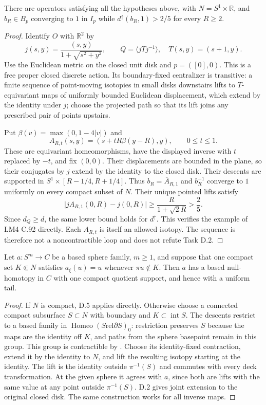 There are operators satisfying all the hypotheses above, with
$N=S^1\times\mathbb R$, and $b_R\in B_p$ converging to $1$ in
$I_p$ while $d^{\uparrow}(b_R,1)>2/5$ for every $R\geq2$.
\begin{proof}
Identify $O$ with $\mathbb R^2$ by
\[
 j(s,y)=\frac{(s,y)}{1+\sqrt{s^2+y^2}},\qquad
 Q=\langle jTj^{-1}\rangle,\quad T(s,y)=(s+1,y).
\]
Use the Euclidean metric on the closed unit disk and
$p=([0],0)$.  This is a free proper closed discrete action.  Its
boundary-fixed centralizer is transitive: a finite sequence of
point-moving isotopies in small disks downstairs lifts to
$T$-equivariant maps of uniformly bounded Euclidean displacement,
which extend by the identity under $j$; choose the projected path
so that its lift joins any prescribed pair of points upstairs.

Put $\beta(v)=\max(0,1-4|v|)$ and
\[
 A_{R,t}(s,y)=(s+tR\beta(y-R),y),\qquad0\leq t\leq1.
\]
These are equivariant homeomorphisms, have the displayed inverse
with $t$ replaced by $-t$, and fix $(0,0)$.  Their displacements
are bounded in the plane, so their conjugates by $j$ extend by
the identity to the closed disk.  Their descents are supported
in $S^1\times[R-1/4,R+1/4]$.  Thus $b_R=\overline A_{R,1}$ and
$b_R^{-1}$ converge to $1$ uniformly on every compact subset of $N$.
Their unique pointed lifts satisfy
\[
 \bigl|jA_{R,1}(0,R)-j(0,R)\bigr|
 \geq\frac{R}{1+\sqrt2R}>\frac25.
\]
Since $d_Q\geq d$, the same lower bound holds for $d^{\uparrow}$.
This verifies the example of LM4 C.92 directly.  Each $A_{R,t}$
is itself an allowed isotopy.  The sequence is therefore not a
noncontractible loop and does not refute Task D.2.
\end{proof}

Let $a:S^m\to C$ be a based sphere family, $m\geq1$, and suppose
that one compact set $K\Subset N$ satisfies
$a_\xi(u)=u$ whenever $\pi u\notin K$.  Then $a$ has a based
null-homotopy in $C$ with one compact quotient support, and hence
with a uniform tail.
\begin{proof}
If $N$ is compact, D.5 applies directly.  Otherwise choose a
connected compact subsurface $S\subset N$ with boundary
and $K\subset\operatorname{int}S$.  The descents restrict to a
based family in
$\operatorname{Homeo}(S\mathbin{\mathrm{rel}}\partial S)_0$:
restriction preserves $S$ because the maps are the identity off
$K$, and paths from the sphere basepoint remain in this group.
This group is contractible by
\cite[Lemma 2.1(ii)]{DE_Yagasaki2000}.  Choose its identity-fixed
contraction, extend it by the identity to $N$, and lift the
resulting isotopy starting at the identity.  The lift is the
identity outside $\pi^{-1}(S)$ and commutes with every deck
transformation.  At the given sphere it agrees with $a$, since
both are lifts with the same value at any point outside
$\pi^{-1}(S)$.  D.2 gives joint extension to the original closed
disk.  The same construction works for all inverse maps.
\end{proof}

